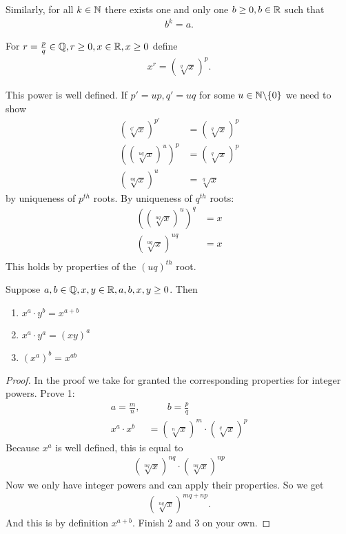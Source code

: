 Similarly, for all $k \in \mathbb N$ there exists one and only one $b \ge 0, b \in \mathbb R$ such that
\begin{align*}
	b^k = a.
\end{align*}

\begin{df}
For $r = \frac p q\in \mathbb Q, r \ge 0, x \in \mathbb R, x\ge 0$  define
\begin{align*}
x^r = \left(\sqrt[q] x\right)^p.
\end{align*}
\end{df}

\begin{rk}
	This power is well defined. If $p' = up, q'=uq$ for some $u \in \mathbb N\backslash \{0\}$ we need to show
	\begin{align*}
	\left( \sqrt[q'] x \right) ^{p'} & = \left(\sqrt[q] x\right)^p \\
	\left(\left( \sqrt[uq] x \right) ^{u}\right)^p & = \left(\sqrt[q] x\right)^p \\
	\left( \sqrt[uq] x \right) ^{u} & = \sqrt[q] x 
	\end{align*}
	by uniqueness of $p^{th}$ roots. By uniqueness of $q^{th}$ roots:
	\begin{align*}
	\left( \left( \sqrt[uq] x \right) ^{u} \right)^q & =  x \\
	\left( \sqrt[uq] x \right) ^{uq}  & =  x \\
	\end{align*}
	This holds by properties of the $(uq)^{th}$ root.
\end{rk}

\begin{pp}
	Suppose $a,b \in \mathbb Q, x,y \in \mathbb R, a,b,x,y \ge 0$. Then 
	\begin{enumerate}
		\item
		$\displaystyle x^a \cdot y^b = x^{a+b}$
		\item
		$x^a \cdot y^a = (xy)^a$
		\item
		$(x^a)^b = x^{ab}$
	\end{enumerate}
\end{pp}

\begin{proof}
	In the proof we take for granted the corresponding properties for integer powers. Prove 1:
	\begin{align*}
	a = \frac m n, & \qquad b = \frac p q \\
	x^a \cdot x^b & = (\sqrt[n] x)^m \cdot (\sqrt[q] x)^p 
	\end{align*}
	Because $x^a$ is well defined, this is equal to
	\begin{align*}
	 (\sqrt[nq] x)^{nq} \cdot (\sqrt[nq] x)^{np}  
	\end{align*}
	Now we only have integer powers and can apply their properties. So we get
	\begin{align*}
	 (\sqrt[nq] x)^{mq+np} .
	\end{align*}
	And this is by definition $x^{a+b}$.
	Finish 2 and 3 on your own.
\end{proof}

